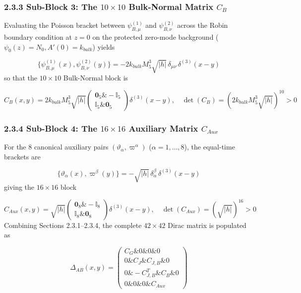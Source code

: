\documentclass[aps,prd,onecolumn,superscriptaddress,nofootinbib,longbibliography,10pt]{revtex4-2}
\begin{document}
{{  
\subsubsection*{2.3.3 Sub-Block 3: The \(10 \times 10\) Bulk-Normal Matrix \(C_B\)}

  Evaluating the Poisson bracket between \(\psi_{B,\mu}^{(1)}\) and \(\psi_{B,\nu}^{(2)}\) across the Robin boundary condition at \(z = 0\) on the protected zero-mode background (\(\psi_0(z) = N_0, A'(0) = k_{bulk}\)) yields


  \[ \{\psi_{B,\mu}^{(1)}(x), \psi_{B,\nu}^{(2)}(y)\} = -2k_{bulk}M_5^3\sqrt{|h|}\,\delta_{\mu\nu}\,\delta^{(3)}(x-y) \]
  so that the \(10 \times 10\) Bulk-Normal block is


  \[ C_B(x,y) = 2k_{bulk}M_5^3\sqrt{|h|}\begin{pmatrix} \mathbf{0}_5 \& -\mathbb{I}_5 \\ \mathbb{I}_5 \& \mathbf{0}_5 \end{pmatrix}\delta^{(3)}(x-y), \quad \det(C_B) = \left(2k_{bulk}M_5^3\sqrt{|h|}\right)^{10} > 0 \]

  
\subsubsection*{2.3.4 Sub-Block 4: The \(16 \times 16\) Auxiliary Matrix \(C_{Aux}\)}

  For the 8 canonical auxiliary pairs \((\vartheta_\alpha, \varpi^\alpha)\) (\(\alpha = 1,\dots,8\)), the equal-time brackets are


  \[ \{\vartheta_\alpha(x), \varpi^\beta(y)\} = -\sqrt{|h|}\,\delta_\alpha^\beta\,\delta^{(3)}(x-y) \]
  giving the \(16 \times 16\) block


  \[ C_{Aux}(x,y) = \sqrt{|h|}\begin{pmatrix} \mathbf{0}_8 \& -\mathbb{I}_8 \\ \mathbb{I}_8 \& \mathbf{0}_8 \end{pmatrix}\delta^{(3)}(x-y), \quad \det(C_{Aux}) = \left(\sqrt{|h|}\right)^{16} > 0 \]
  Combining Sections 2.3.1–2.3.4, the complete \(42 \times 42\) Dirac matrix is populated as


  \[ \Delta_{AB}(x,y) = \begin{pmatrix} C_G \& 0 \& 0 \& 0 \\ 0 \& C_J \& C_{J,B} \& 0 \\ 0 \& -C_{J,B}^T \& C_B \& 0 \\ 0 \& 0 \& 0 \& C_{Aux} \end{pmatrix} \]
  
}}
\end{document}

